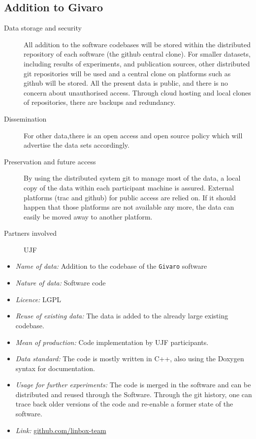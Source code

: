 \documentclass{../../Proposal/LaTeX-proposal/deliverablereport}
\begin{document}
\begin{enumerate}
\subsection{Addition to Givaro}

\begin{description}
\item[Data storage and security] All addition to the software codebases will be stored within the distributed repository of each software (the github central clone). For smaller datasets, including results of experiments, and publication sources, other distributed git repositories will be used and a central clone on platforms such as github will be stored. All the present data is public, and there is no concern about unauthorised access. Through cloud hosting and local clones of repositories, there are backups and redundancy.
\item[Dissemination] For other data,there is an open access and open source policy which will advertise the data sets accordingly.
\item[Preservation and future access] By using the distributed system git to manage most of the data, a local copy of the data within each participant machine is assured. External platforms (trac and github) for public access are relied on. If it should happen that those platforms are not available any more, the data can easily be moved away to another platform.
\item[Partners involved] UJF
\end{description}


\begin{itemize}
\item\textit{Name of data:} Addition to the codebase of the \texttt{Givaro} software
\item\textit{Nature of data:} Software code
\item\textit{Licence:} LGPL
\item\textit{Reuse of existing data:} The data is added to the already large existing codebase.
\item\textit{Mean of production:} Code implementation by UJF participants.
\item\textit{Data standard:} The code is mostly written in C++, also using the Doxygen syntax for documentation.
\item\textit{Usage for further experiments:} The code is merged in the software and can be distributed and reused through the Software. Through the git history,
one can trace back older versions of the code and re-enable a former state of the software.
\item\textit{Link:} \href{https://github.com/linbox-team}{github.com/linbox-team}
\end{itemize}




\end{enumerate}
\end{document}
